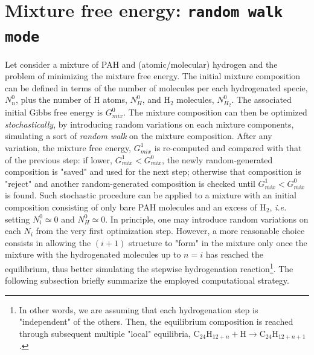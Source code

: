 \documentclass[a4paper, 11pt, twoside]{book}
\begin{document}
\section*{Mixture free energy: \texttt{random walk mode}}
Let consider a mixture of PAH and (atomic/molecular) hydrogen and the problem of minimizing the mixture free energy. The initial mixture composition can be defined in terms of the number of molecules per each hydrogenated specie, $N^0_n$, plus the number of H atoms, $N^0_H$, and $\text{H}_2$ molecules, $N^0_{H_2}$. The associated initial Gibbs free energy is $G_{mix}^0$. The mixture composition can then be optimized \emph{stochastically}, by introducing random variations on each mixture components, simulating a sort of \emph{random walk} on the mixture composition. After any variation,  the mixture free energy, $G_{mix}^{1}$ is re-computed and compared with that of the previous step: if lower, $G_{mix}^1 < G_{mix}^0$, the newly random-generated composition is "saved" and used for the next step; otherwise that composition is "reject" and another random-generated composition is checked until $G_{mix}^1 < G_{mix}^0$ is found. Such stochastic procedure can be applied to a mixture with an initial composition consisting of only bare PAH molecules and an excess of $\text{H}_2$, \emph{i.e.} setting $N^0_i\simeq 0$ and $N^0_{H}\simeq 0$. In principle, one may introduce random variations on each $N_i$ from the very first optimization step. However, a more reasonable choice consists in allowing the $(i+1)$ structure to "form" in the mixture only once the mixture with the hydrogenated molecules up to $n=i$ has reached the equilibrium, thus better simulating the stepwise hydrogenation reaction\footnote{In other words, we are assuming that each hydrogenation step is "independent" of the others. Then, the equilibrium composition is reached through subsequent multiple "local" equilibria, $\text{C}_{24}\text{H}_{12+n} + \text{H} \rightarrow \text{C}_{24}\text{H}_{12+n+1}$.}. The following subsection briefly summarize the employed computational strategy.
\end{document}

